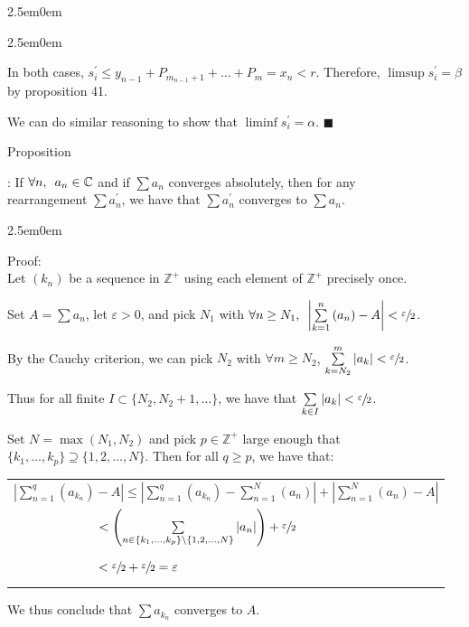 \documentclass{book}
\newcommand{\hTwo}{%
   \color{MidnightBlue}%
   \fontsize{13}{15}\selectfont%
}
\newcommand{\hThree}{%
   \color{PineGreen}
   \fontsize{13}{15}\selectfont%
}
\newenvironment{myIndent}{%
   \begin{adjustwidth}{2.5em}{0em}%
}{%
   \end{adjustwidth}%
}
\newcommand{\retTwo}{\hfill\bigbreak}
\newcommand{\myHS}{ \hspace{0.5em}}
\newcounter{PropNumber}
\newcommand{\propCount}[1][1]{%
   \addtocounter{PropNumber}{#1}%
   \thePropNumber%
}
\begin{document}
      {\begin{myIndent}\hTwo
      {\begin{myIndent}\hThree

         In both cases, $s_i^\prime \leq y_{n-1} + P_{m_{n-1}+1} + \ldots + P_m = x_n < r$. Therefore, $\limsup{s_i^\prime} = \beta$ by proposition 41. \retTwo

         We can do similar reasoning to show that $\liminf{s_i^\prime} = \alpha$. $\blacksquare$ \retTwo
      \end{myIndent}}

      Proposition \propCount: If $\forall n, \myHS a_n \in \mathbb{C}$ and if $\sum a_n$ converges absolutely, then for any\\ rearrangement $\sum a_n^\prime$, we have that $\sum a_n^\prime$ converges to $\sum a_n$.

      {\begin{myIndent}\hThree
         Proof:\\
         Let $(k_n)$ be a sequence in $\mathbb{Z}^+$ using each element of $\mathbb{Z}^+$ precisely once. \retTwo

         Set $A = \sum a_n$, let $\varepsilon > 0$, and pick $N_1$ with $\forall n \geq N_1, \myHS \left| \sum\limits_{k=1}^n{(a_n)} - A \right| < \sfrac{\varepsilon}{2}$. \retTwo

         By the Cauchy criterion, we can pick $N_2$ with $\forall m \geq N_2$, $\sum\limits_{k=N_2}^m|a_k| < \sfrac{\varepsilon}{2}$. \retTwo

         Thus for all finite $I \subset \{N_2, N_2 + 1, \ldots\}$, we have that $\sum\limits_{k\in I}|a_k| < \sfrac{\varepsilon}{2}$. \retTwo

         Set $N = \max(N_1, N_2)$ and pick $p \in \mathbb{Z}^+$ large enough that\\ $\{k_1, \ldots, k_p\} \supseteq \{1, 2, \ldots, N\}$. Then for all $q \geq p$, we have that:\\
         
         \begin{tabular}{l}
            $\left| \sum\limits_{n=1}^q (a_{k_n}) - A \right| \leq \left| \sum\limits_{n=1}^q (a_{k_n}) - \sum\limits_{n=1}^N (a_n) \right| + \left| \sum\limits_{n=1}^N (a_n) - A \right|$ \\ [8pt]

            $\phantom{\left| \sum\limits_{n=1}^q (a_{k_n}) - A \right|} < \left(\sum\limits_{n \in \{k_1, \ldots, k_p\} \setminus \{1, 2, \ldots, N\}}|a_n|\right) + \sfrac{\varepsilon}{2}$ \\ [8pt]

            $\phantom{\left| \sum\limits_{n=1}^q (a_{k_n}) - A \right|} < \sfrac{\varepsilon}{2} + \sfrac{\varepsilon}{2} = \varepsilon$\retTwo
         \end{tabular}

         We thus conclude that $\sum a_{k_n}$ converges to $A$.
      \end{myIndent}}
   \end{myIndent}}
\end{document}
